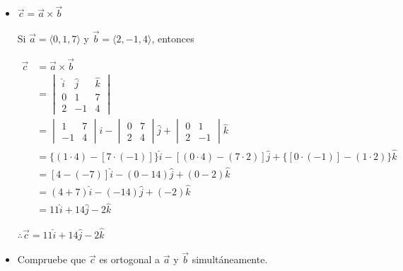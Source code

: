 \documentclass[12pt]{article}
\begin{document}
\begin{itemize}

\item $\vec{c}=\vec{a} \times \vec{b}$

  Si $\vec{a} = \langle 0, 1, 7 \rangle$ y $\vec{b} = \langle 2, -1, 4 \rangle$, entonces
  
  \begin{equation*}
    \begin{split}
      \vec{c} 
      &=
      \vec{a} \times \vec{b} \\
      &=
      \begin{vmatrix}
        \hat{i} & \hat{j} & \hat{k} \\
        0 & 1 & 7 \\
        2 & -1 & 4
      \end{vmatrix} \\
      &=
      \begin{vmatrix}
        1 & 7 \\
        -1 & 4
      \end{vmatrix}
      \hat{i}
      -
      \begin{vmatrix}
        0 & 7 \\
        2 & 4
      \end{vmatrix}
      \hat{j}
      +
      \begin{vmatrix}
        0 & 1 \\
        2 & -1
      \end{vmatrix}
      \hat{k}\\
      &=
      \{(1 \cdot 4) - [7 \cdot (-1)]\}
      \hat{i}
      -
      [(0 \cdot 4) - (7 \cdot 2)]
      \hat{j}
      +
      \{[0 \cdot (-1)] - (1 \cdot 2)\}
      \hat{k} \\
      &=
          [4-(-7)]
          \hat{i}
          -
          (0-14)
          \hat{j}
          +
          (0-2)
          \hat{k} \\
      &=
          (4 + 7)
          \hat{i}
          -
          (-14)
          \hat{j}
          +
          (-2)
          \hat{k} \\
      &=
          11 \hat{i} + 14 \hat{j} - 2 \hat{k} 
    \end{split}
  \end{equation*}

  $\therefore \vec{c} = 11 \hat{i} + 14 \hat{j} - 2 \hat{k} $

\item Compruebe que $\vec{c}$ es ortogonal a $\vec{a}$ y $\vec{b}$ simultáneamente.


\end{itemize}
\end{document}
